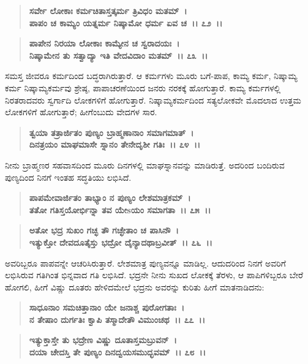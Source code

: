 \begin{verse}
\textbf{ಸರ್ವೇ ಲೋಕಾಃ ಕರ್ಮಚಿತಾಸ್ತತ್ಕರ್ಮ ತ್ರಿವಿಧಂ ಮತಮ್~।}\\\textbf{ಪಾಪಂ ಚ ಕಾಮ್ಯಂ ಯತ್ನರ್ಮ ನಿಷ್ಕಾಮೋ ಧರ್ಮ ಏವ ಚ~।। ೭೨~।।} 
\end{verse}

\begin{verse}
\textbf{ಪಾಪೇನ ನಿರಯಾ ಲೋಕಾಃ ಕಾಮ್ಯೇನ ಚ ಸ್ವರಾದಯಃ~।}\\\textbf{ನಿಷ್ಕಾಮೇನ ತು ಸತ್ವಾದ್ಯಾ ಇತಿ ವೇದವಿದಾಂ ಮತಮ್~।। ೭೩~।।}
\end{verse}

ಸಮಸ್ತ ಜೀವರೂ ಕರ್ಮದಿಂದ ಬದ್ಧರಾಗಿರುತ್ತಾರೆ. ಆ ಕರ್ಮಗಳು ಮೂರು ಬಗೆ-ಪಾಪ, ಕಾಮ್ಯ ಕರ್ಮ, ನಿಷ್ಕಾಮ್ಯ ಕರ್ಮ ನಿಷ್ಕಾಮ್ಯಕರ್ಮವು ಶ್ರೇಷ್ಠ, ಪಾಪಾಚರಣೆಯಿಂದ ಜನರು ನರಕಕ್ಕೆ ಹೋಗುತ್ತಾರೆ. ಕಾಮ್ಯ ಕರ್ಮಗಳಲ್ಲಿ ನಿರತರಾದವರು ಸ್ವರ್ಗಾದಿ ಲೋಕಗಳಿಗೆ ಹೋಗುತ್ತಾರೆ. ನಿಷ್ಕಾಮ್ಯಕರ್ಮದಿಂದ ಸತ್ಯಲೋಕವೇ ಮೊದಲಾದ ಉತ್ತಮ ಲೋಕಗಳಿಗೆ ಹೋಗುತ್ತಾರೆ; ಹೀಗೆಂಬುದು ವೇದಗಳ ಸಾರ.

\begin{verse}
\textbf{ತ್ವಯಾ ತತ್ರಾರ್ಜಿತಂ ಪುಣ್ಯಂ ಬ್ರಾಹ್ಮಣಾನಾಂ ಸಮಾಗಮಾತ್~।}\\\textbf{ದಿನತ್ರಯಂ ಮಾಘಮಾಸೇ ಸ್ನಾನಂ ತೇನೇದೃಶೀ ಗತಿಃ~।। ೭೪~।।}
\end{verse}

ನೀನು ಬ್ರಾಹ್ಮಣರ ಸಹವಾಸದಿಂದ ಮೂರು ದಿನಗಳಲ್ಲಿ ಮಾಘಸ್ನಾನವನ್ನು ಮಾಡಿರುತ್ತೆ. ಅದರಿಂದ ಬಂದಿರುವ ಪುಣ್ಯದಿಂದ ನಿನಗೆ ಇಂತಹ ಸದ್ಧತಿಯು ಲಭಿಸಿದೆ.

\begin{verse}
\textbf{ಪಾಪಮೇವಾರ್ಜಿತಂ ತಾಭ್ಯಾಂ ನ ಪುಣ್ಯಂ ಲೇಶಮಾತ್ರಕಮ್~।}\\\textbf{ತತೋ ಗತಿಸ್ತಯೋರ್ಭಿನ್ನಾ ತವ ಯೇsಯಂ ಸಮಾಗತಾ~।। ೭೫~।। }
\end{verse}

\begin{verse}
\textbf{ಅತೋ ಭದ್ರ ಸುಖಂ ಗಚ್ಛ ತೌ ಗಚ್ಛೇತಾಂ ಚ ಪಾಸಿನೌ~।}\\\textbf{ಇತ್ಯುಕ್ತೋ ದೇವದೂತೈಸ್ತು ಭದ್ರೋ ದೈನ್ಯಾದಥಾಬ್ರವೀತ್~।। ೭೬~।।}
\end{verse}

ಅವರಿಬ್ಬರೂ ಪಾಪವನ್ನೇ ಆಚರಿಸಿರುತ್ತಾರೆ. ಲೇಶಮಾತ್ರ ಪುಣ್ಯವನ್ನೂ ಮಾಡಿಲ್ಲ. ಆದುದರಿಂದ ನಿನಗೆ ಅವರಿಗೆ ಲಭಿಸಿರುವ ಗತಿಗಿಂತ ಭಿನ್ನವಾದ ಗತಿ ಲಭಿಸಿದೆ. ಭದ್ರನೇ ನೀನು ಸುಖದ ಲೋಕಕ್ಕೆ ತೆರಳು, ಆ ಪಾಪಿಗಳಿಬ್ಬರೂ ಬೇರೆ ಹೋಗಲಿ, ಹೀಗೆ ವಿಷ್ಣು ದೂತರು ಹೇಳಿದಮೇಲೆ ಭದ್ರನು ಅವರನ್ನು ಕುರಿತು ಹೀಗೆ ಮಾತನಾಡಿದನು:

\begin{verse}
\textbf{ಸಾಧೂನಾಂ ಸಮಚಿತ್ತಾನಾಂ ಯೇ ಜನಾಶ್ಚ ಪುರೋಗತಾಃ~।}\\\textbf{ನ ತೇಷಾಂ ದುರ್ಗತಿಃ ಕ್ವಾಪಿ ತಸ್ಮಾದೇತೌ ವಿಮುಂಚಥ~।। ೭೭~।।} 
\end{verse}

\begin{verse}
\textbf{ಇತ್ಯುಕ್ತಾಸ್ತೇ ತು ಭದ್ರೇಣ ವಿಷ್ಣು ದೂತಾಸ್ತಮಬ್ರುವನ್~।}\\\textbf{ದಯಾ ಚೇದಸ್ತಿ ತೇ ಪುಣ್ಯಂ ದಿನದ್ವಯಸಮುದ್ಭವಮ್~।। ೭೮~।। }
\end{verse}

